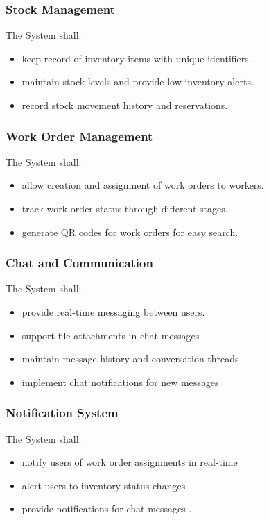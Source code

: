 \subsubsection{Stock Management}
The System shall:
\begin{itemize}
    \item keep record of inventory items with unique identifiers.
    \item maintain stock levels and provide low-inventory alerts.
    \item record stock movement history and reservations.
\end{itemize}

\subsubsection{Work Order Management}
The System shall:
\begin{itemize}
    \item allow creation and assignment of work orders to workers.
    \item track work order status through different stages.
    \item generate QR codes for work orders for easy search.
\end{itemize}

\subsubsection{Chat and Communication}
The System shall:
\begin{itemize}
    \item provide real-time messaging between users.
    \item support file attachments in chat messages
    \item maintain message history and conversation threads
    \item implement chat notifications for new messages
\end{itemize}

\subsubsection{Notification System}
The System shall:
\begin{itemize}
    \item notify users of work order assignments in real-time
    \item alert users to inventory status changes
    \item provide notifications for chat messages .
\end{itemize}

